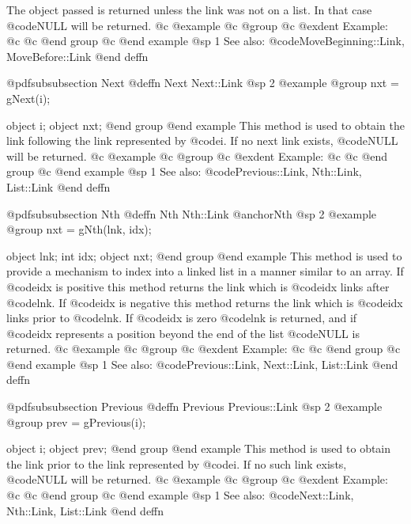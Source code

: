 The object passed is returned unless the link was not on a list.  In
that case @code{NULL} will be returned.
@c @example
@c @group
@c @exdent Example:
@c 
@c @end group
@c @end example
@sp 1
See also:  @code{MoveBeginning::Link, MoveBefore::Link}
@end deffn














@pdfsubsubsection {Next}
@deffn {Next} Next::Link
@sp 2
@example
@group
nxt = gNext(i);

object  i;
object  nxt;
@end group
@end example
This method is used to obtain the link following the link represented by
@code{i}.   If no next link exists, @code{NULL} will be returned.
@c @example
@c @group
@c @exdent Example:
@c 
@c @end group
@c @end example
@sp 1
See also:  @code{Previous::Link, Nth::Link, List::Link}
@end deffn




















@pdfsubsubsection {Nth}
@deffn {Nth} Nth::Link
@anchor{Nth}
@sp 2
@example
@group
nxt = gNth(lnk, idx);

object  lnk;
int     idx;
object  nxt;
@end group
@end example
This method is used to provide a mechanism to index into a linked list
in a manner similar to an array.  If @code{idx} is positive this method
returns the link which is @code{idx} links after @code{lnk}.  If @code{idx}
is negative this method returns the link which is @code{idx} links prior to
@code{lnk}.  If @code{idx} is zero @code{lnk} is returned, and if @code{idx}
represents a position beyond the end of the list @code{NULL} is returned.
@c @example
@c @group
@c @exdent Example:
@c 
@c @end group
@c @end example
@sp 1
See also:  @code{Previous::Link, Next::Link, List::Link}
@end deffn










@pdfsubsubsection {Previous}
@deffn {Previous} Previous::Link
@sp 2
@example
@group
prev = gPrevious(i);

object  i;
object  prev;
@end group
@end example
This method is used to obtain the link prior to the link represented by
@code{i}.  If no such link exists, @code{NULL} will be returned.
@c @example
@c @group
@c @exdent Example:
@c 
@c @end group
@c @end example
@sp 1
See also:  @code{Next::Link, Nth::Link, List::Link}
@end deffn







